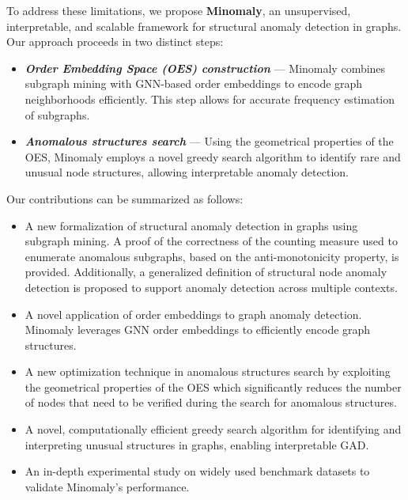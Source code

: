 \documentclass[pdflatex,sn-mathphys-num]{sn-jnl}%
\theoremstyle{thmstyleone}%
\theoremstyle{thmstyletwo}%
\theoremstyle{thmstylethree}%
\begin{document}
To address these limitations, we propose \textbf{Minomaly}, an unsupervised, interpretable, and scalable framework for structural anomaly detection in graphs. Our approach proceeds in two distinct steps:
\begin{itemize}
    \item \textbf{\textit{Order Embedding Space (OES) construction}}  --- Minomaly combines subgraph mining with GNN-based order embeddings to encode graph neighborhoods efficiently. This step allows for accurate frequency estimation of subgraphs.
    \item \textbf{\textit{Anomalous structures search}}  --- Using the geometrical properties of the OES, Minomaly employs a novel greedy search algorithm to identify rare and unusual node structures, allowing interpretable anomaly detection.
\end{itemize}
Our contributions can be summarized as follows:
\begin{itemize}
    \item A new formalization of structural anomaly detection in graphs using subgraph mining. A proof of the correctness of the counting measure used to enumerate anomalous subgraphs, based on the anti-monotonicity property, is provided. Additionally, a generalized definition of structural node anomaly detection is proposed to support anomaly detection across multiple contexts.
    \item A novel application of order embeddings to graph anomaly detection. Minomaly leverages GNN order embeddings to efficiently encode graph structures.
    \item A new optimization technique in anomalous structures search by exploiting the geometrical properties of the OES which significantly reduces the number of nodes that need to be verified during the search for anomalous structures.
    \item A novel, computationally efficient greedy search algorithm for identifying and interpreting unusual structures in graphs, enabling interpretable GAD.
    \item An in-depth experimental study on widely used benchmark datasets to validate Minomaly's performance.
\end{itemize}
\end{document}
